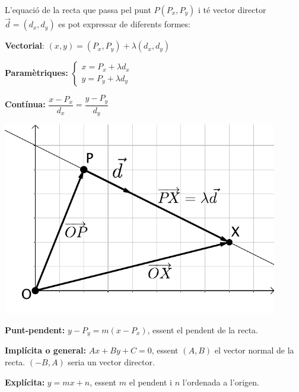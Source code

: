 \begin{theorybox}
	L'equació de la recta que passa pel punt $P(P_x,P_y)$ i té vector director $\vec d=(d_x, d_y)$ es pot expressar de diferents formes:
	
	\begin{minipage}{0.56\textwidth}
	\textbf{Vectorial}: $(x,y)=(P_x,P_y)+\lambda (d_x, d_y)$ \vspace{0.25cm}
	
	\textbf{Paramètriques:} $\left\{ \begin{array}{l} x=P_x+ \lambda d_x \\ y=P_y+ \lambda d_y  \end{array} \right.$\vspace{0.25cm}
	
	\textbf{Contínua:} $\dfrac{x-P_x}{d_x}=\dfrac{y-P_y}{d_y}$\vspace{0.25cm}
	\end{minipage}
	\begin{minipage}{0.4\textwidth}
		\centering
		\includegraphics[width=0.9\textwidth]{img-09/rectavec}
	\end{minipage}
	\textbf{Punt-pendent:} $y-P_y=m(x-P_x)$, essent  el pendent de la recta.\vspace{0.25cm}
	
	\textbf{Implícita o general:} $Ax+By+C=0$, essent $(A,B)$ el vector normal de la recta. $(-B,A)$ seria un vector director.\vspace{0.25cm}
		
	
	\textbf{Explícita:} $y=mx+n$, essent $m$ el pendent i $n$ l'ordenada a l'origen.
	
\end{theorybox}

